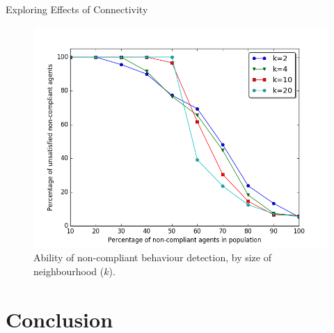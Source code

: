 \begin{frame}{Exploring Effects of Connectivity}

\begin{figure}[htbp]
\centering
\includegraphics{pics/kgeneral.png}
\caption{Ability of non-compliant behaviour detection, by size of
neighbourhood (\(k\)).}
\end{figure}

\end{frame}

\section{Conclusion}\label{conclusion}

